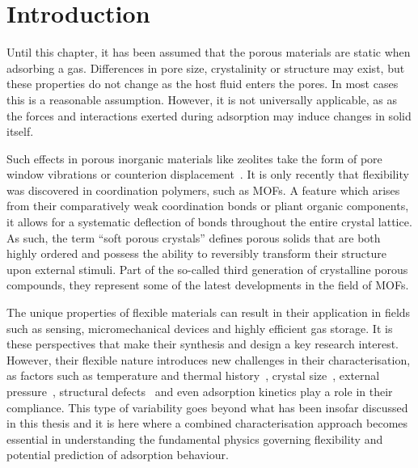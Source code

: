 
\section{Introduction}

Until this chapter, it has been assumed that the porous materials are 
static when adsorbing a gas. Differences in pore size, crystalinity 
or structure may exist, but these properties do not change
as the host fluid enters the pores.
In most cases this is a reasonable assumption. However, it is not 
universally applicable, as as the forces and interactions exerted 
during adsorption may induce changes in solid itself.

Such effects in porous inorganic materials like zeolites take the form
of pore window vibrations or counterion 
displacement~\cite{coudertMolecularInsightCO2017}.
It is only recently that flexibility was discovered in coordination
polymers, such as MOFs. A feature which arises from 
their comparatively weak coordination bonds or pliant organic components,
it allows for a systematic deflection of bonds throughout the 
entire crystal lattice.
As such, the term ``soft porous crystals'' defines porous solids that are 
both highly ordered and possess the ability to reversibly transform
their structure upon external stimuli. Part of the so-called
third generation of crystalline porous compounds, they represent 
some of the latest developments in the field of MOFs.

The unique properties of flexible materials can result in
their application in fields such as sensing, micromechanical
devices and highly efficient gas storage. It is these perspectives
that make their synthesis and design a key research interest.
However, their flexible nature introduces new challenges in
their characterisation, as factors such as temperature and
thermal history~\cite{liuReversibleStructuralTransition2008},
crystal size~\cite{zhangCrystalSizeDependentStructuralTransitions2014, %
krauseEffectCrystalliteSize2018}, external 
pressure~\cite{itoReversiblePoreSize2013, %
chanutUsingExternalFactors2016}, structural defects~\cite{bennettInterplayDefectsDisorder2016} 
and even adsorption kinetics play a role in their compliance.
This type of variability goes beyond what has been insofar discussed
in this thesis and it is here where a combined characterisation approach
becomes essential in understanding the fundamental physics
governing flexibility and potential prediction of adsorption behaviour. 

